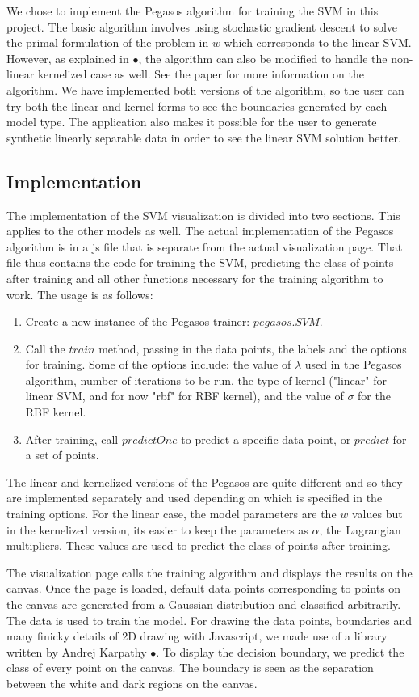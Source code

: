 \documentclass[11pt,letterpaper]{article}
\begin{document}
We chose to implement the Pegasos algorithm for training the SVM in this project. The basic algorithm involves using stochastic gradient descent to solve the primal formulation of the problem in $w$ which corresponds to the linear SVM. However, as explained  in $•$, the algorithm can also be modified to handle the non-linear kernelized case as well. See the paper for more information on the algorithm. We have implemented both versions of the algorithm, so the user can try both the linear and kernel forms to see the boundaries generated by each model type. The application also makes it possible for the user to generate synthetic linearly separable data in order to see the linear SVM solution better. 

\subsection{Implementation}
The implementation of the SVM visualization is divided into two sections. This applies to the other models as well. The actual implementation of the Pegasos algorithm is in a js file that is separate from the actual visualization page. That file thus contains the code for training the SVM, predicting the class of points after training and all other functions necessary for the training algorithm to work. The usage is as follows:
\begin{enumerate}[i]
\item
Create a new instance of the Pegasos trainer: $pegasos.SVM$.
\item
Call the $train$ method, passing in the data points, the labels and the options for training. Some of the options include: the value of $\lambda$ used in the Pegasos algorithm, number of iterations to be run, the type of kernel ("linear" for linear SVM, and for now "rbf" for RBF kernel), and the value of $\sigma$ for the RBF kernel.
\item
After training, call $predictOne$ to predict a specific data point, or $predict$ for a set of points.
\end{enumerate}
The linear and kernelized versions of the Pegasos are quite different and so they are implemented separately and used depending on which is specified in the training options. For the linear case, the model parameters are the $w$ values but in the kernelized version, its easier to keep the parameters as $\alpha$, the Lagrangian multipliers. These values are used to predict the class of points after training.

The visualization page calls the training algorithm and displays the results on the canvas. Once the page is loaded, default data points corresponding to points on the canvas are generated from a Gaussian distribution and classified arbitrarily. The data is used to train the model. For drawing the data points, boundaries and many finicky details of 2D drawing with Javascript, we made use of a library written by Andrej Karpathy $•$. To display the decision boundary, we predict the class of every point on the canvas. The boundary is seen as the separation between the white and dark regions on the canvas.
\end{document}
